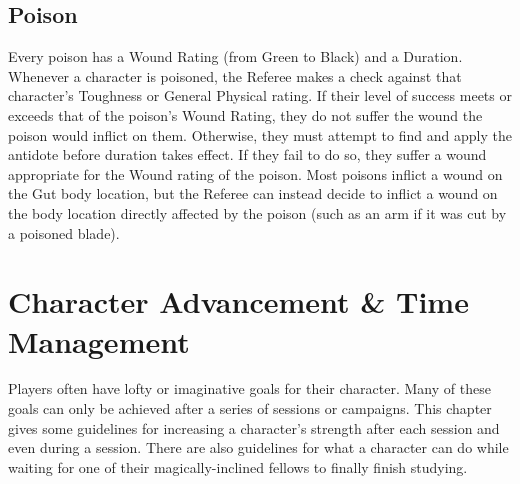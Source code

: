 \documentclass[oneside]{book}
\begin{document}
\begin{multicols}{2}
\section{Poison}
Every poison has a Wound Rating (from Green to Black) and a Duration. Whenever a character is poisoned, the Referee makes a check against that character's Toughness or General Physical rating. If their level of success meets or exceeds that of the poison's Wound Rating, they do not suffer the wound the poison would inflict on them. Otherwise, they must attempt to find and apply the antidote before duration takes effect. If they fail to do so, they suffer a wound appropriate for the Wound rating of the poison. Most poisons inflict a wound on the Gut body location, but the Referee can instead decide to inflict a wound on the body location directly affected by the poison (such as an arm if it was cut by a poisoned blade).

\end{multicols}

\chapter{Character Advancement \& Time Management}

Players often have lofty or imaginative goals for their character. Many of these goals can only be achieved after a series of sessions or campaigns. This chapter gives some guidelines for increasing a character's strength after each session and even during a session. There are also guidelines for what a character can do while waiting for one of their magically-inclined fellows to finally finish studying. \newline
\end{document}
